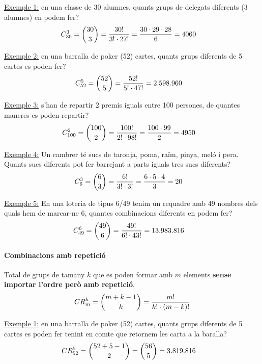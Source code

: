 \documentclass{article}
\begin{document}
\underline{Exemple 1:} en una classe de 30 alumnes, quants grups de delegats diferents (3 alumnes) en podem fer?
\begin{align*}
C_{30}^{3} & = \dbinom{30}{3}= \dfrac{30!}{3! \cdot 27!} = \dfrac{30 \cdot 29 \cdot 28}{6} = 4060
\end{align*}

\underline{Exemple 2:} en una barralla de poker (52) cartes, quants grups diferents de 5 cartes es poden fer?
\begin{align*}
C_{52}^{5} & = \dbinom{52}{5}= \dfrac{52!}{5! \cdot 47!} = 2.598.960
\end{align*}

\underline{Exemple 3:} s'han de repartir 2 premis iguals entre 100 persones, de quantes maneres es poden repartir?
\begin{align*}
C_{100}^{2} & = \dbinom{100}{2}= \dfrac{100!}{2! \cdot 98!} = \dfrac{100 \cdot 99}{2} = 4950
\end{align*}

\underline{Exemple 4:} Un cambrer té sucs de taronja, poma, raïm, pinya, meló i pera. Quants sucs diferents pot fer barrejant a parts iguals tres sucs diferents?
\begin{align*}
C_{6}^{3} & = \dbinom{6}{3}= \dfrac{6!}{3! \cdot 3!} = \dfrac{6 \cdot 5 \cdot 4}{3} = 20
\end{align*}

\underline{Exemple 5:} En una loteria de tipus 6/49 tenim un requadre amb 49 nombres dels quals hem de marcar-ne 6, quantes combinacions diferents en podem fer?
\begin{align*}
C_{49}^{6} & = \dbinom{49}{6}= \dfrac{49!}{6! \cdot 43!} = 13.983.816
\end{align*}

\paragraph{Combinacions amb repetició}
Total de grups de tamany $k$ que es poden formar amb $m$ elements \textbf{sense importar l'ordre però amb repetició}.
\begin{equation*}
CR_{m}^{k} = \dbinom{m + k - 1}{k}= \dfrac{m!}{k! \cdot (m-k)!}
\end{equation*}

\underline{Exemple 1:} en una barralla de poker (52) cartes, quants grups diferents de 5 cartes es poden fer tenint en comte que retornem les carta a la baralla?
\begin{align*}
CR_{52}^{5} & = \dbinom{52 + 5 - 1}{2} = \dbinom{56}{5} = 3.819.816
\end{align*}
\end{document}
